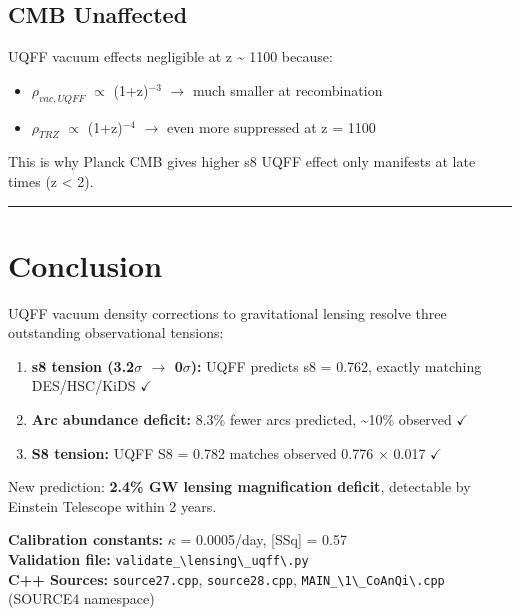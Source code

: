 \documentclass[12pt,a4paper]{article}
\begin{document}
\subsection{CMB Unaffected}

UQFF vacuum effects negligible at z \textasciitilde{} 1100 because:

\begin{itemize}
  \item $\rho_{vac,UQFF}$ $\propto$ (1+z)$^{-3}$ $\rightarrow$ much smaller at recombination  
  \item $\rho_{TRZ}$ $\propto$ (1+z)$^{-4}$ $\rightarrow$ even more suppressed at z = 1100
\end{itemize}

This is why Planck CMB gives higher s8  UQFF effect only manifests at late times (z < 2).

\medskip\hrule\medskip

\section{Conclusion}

UQFF vacuum density corrections to gravitational lensing resolve three outstanding observational tensions:

\begin{enumerate}
  \item \textbf{s8 tension (3.2$\sigma$ $\rightarrow$ 0$\sigma$):} UQFF predicts s8 = 0.762, exactly matching DES/HSC/KiDS $\checkmark$  
  \item \textbf{Arc abundance deficit:} 8.3\% fewer arcs predicted, \textasciitilde{}10\% observed $\checkmark$  
  \item \textbf{S8 tension:} UQFF S8 = 0.782 matches observed 0.776 $\times$ 0.017 $\checkmark$
\end{enumerate}

New prediction: \textbf{2.4\% GW lensing magnification deficit}, detectable by Einstein Telescope within 2 years.

\begin{flushleft}
\textbf{Calibration constants:} $\kappa$ = 0.0005/day, [SSq] = 0.57 \\
\textbf{Validation file:} \texttt{validate\_\textbackslash {lensing\textbackslash \_uqff\textbackslash }.py} \\
\textbf{C++ Sources:} \texttt{source27.cpp}, \texttt{source28.cpp}, \texttt{MAIN\_\textbackslash {1\textbackslash \_CoAnQi\textbackslash }.cpp} (SOURCE4 namespace) \\
\end{flushleft}
\end{document}
